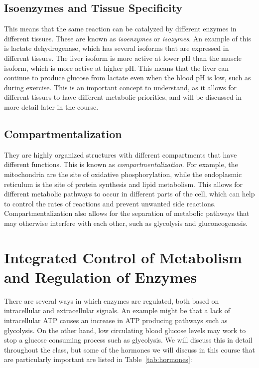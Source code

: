 \documentclass{tufte-handout}
\begin{document}
\subsection{Isoenzymes and Tissue Specificity}
  This means that the same reaction can be catalyzed by different enzymes in different tissues.  These are known as \emph{isoenzymes} or \emph{isozymes}.  An example of this is lactate dehydrogenase, which has several isoforms that are expressed in different tissues.  The liver isoform is more active at lower pH than the muscle isoform, which is more active at higher pH.  This means that the liver can continue to produce glucose from lactate even when the blood pH is low, such as during exercise.  This is an important concept to understand, as it allows for different tissues to have different metabolic priorities, and will be discussed in more detail later in the course.

\subsection{Compartmentalization}
  They are highly organized structures with different compartments that have different functions.  This is known as \emph{compartmentalization}.  For example, the mitochondria are the site of oxidative phosphorylation, while the endoplasmic reticulum is the site of protein synthesis and lipid metabolism.  This allows for different metabolic pathways to occur in different parts of the cell, which can help to control the rates of reactions and prevent unwanted side reactions.  Compartmentalization also allows for the separation of metabolic pathways that may otherwise interfere with each other, such as glycolysis and gluconeogenesis.

\section{Integrated Control of Metabolism and Regulation of Enzymes}

There are several ways in which enzymes are regulated, both based on intracellular and extracellular signals.  An example might be that a lack of intracellular ATP causes an increase in ATP producing pathways such as glycolysis.  On the other hand, low circulating blood glucose levels may work to stop a glucose consuming process such as glycolysis.  We will discuss this in detail throughout the class, but some of the hormones we will discuss in this course that are particularly important are listed in Table~\ref{tab:hormones}:
\end{document}
